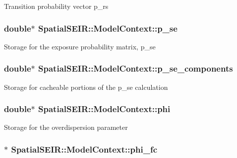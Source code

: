 Transition probability vector p\-\_\-rs \hypertarget{classSpatialSEIR_1_1ModelContext_a3039a6c9014a3465b38f5becbe369a4a}{
\subsubsection[{p\-\_\-se}]{\setlength{\rightskip}{0pt plus 5cm}double$\ast$ Spatial\-S\-E\-I\-R\-::\-Model\-Context\-::p\-\_\-se}}\label{classSpatialSEIR_1_1ModelContext_a3039a6c9014a3465b38f5becbe369a4a}
Storage for the exposure probability matrix, p\-\_\-se \hypertarget{classSpatialSEIR_1_1ModelContext_aa6a04d39cec1ace0e7c57c3551d12bc4}{
\subsubsection[{p\-\_\-se\-\_\-components}]{\setlength{\rightskip}{0pt plus 5cm}double$\ast$ Spatial\-S\-E\-I\-R\-::\-Model\-Context\-::p\-\_\-se\-\_\-components}}\label{classSpatialSEIR_1_1ModelContext_aa6a04d39cec1ace0e7c57c3551d12bc4}
Storage for cacheable portions of the p\-\_\-se calculation \hypertarget{classSpatialSEIR_1_1ModelContext_a7873aaa6fe424c33d09287e63cdb6787}{
\subsubsection[{phi}]{\setlength{\rightskip}{0pt plus 5cm}double$\ast$ Spatial\-S\-E\-I\-R\-::\-Model\-Context\-::phi}}\label{classSpatialSEIR_1_1ModelContext_a7873aaa6fe424c33d09287e63cdb6787}
Storage for the overdispersion parameter \hypertarget{classSpatialSEIR_1_1ModelContext_a97d54a9e4778575b5c88264f88831fc4}{
\subsubsection[{phi\-\_\-fc}]{$\ast$ Spatial\-S\-E\-I\-R\-::\-Model\-Context\-::phi\-\_\-fc}}\label{classSpatialSEIR_1_1ModelContext_a97d54a9e4778575b5c88264f88831fc4}
